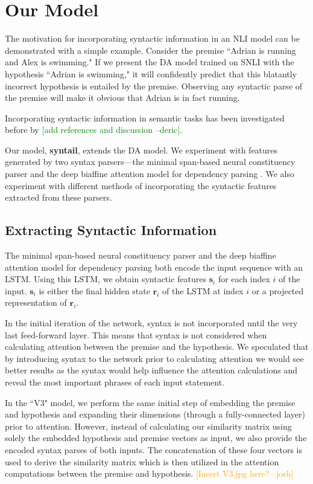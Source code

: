 \documentclass[11pt,a4paper]{article}
\newcommand{\dpcomment}[1]{\textcolor{green}{[#1 --deric]}}
\newcommand{\jbcomment}[1]{\textcolor{orange}{[#1 --josh]}}
\begin{document}
\section{Our Model}

The motivation for incorporating syntactic information in an NLI model
can be demonstrated with a simple example. Consider the premise ``Adrian is running
and Alex is swimming." If we present the DA model trained on SNLI with the
hypothesis ``Adrian is swimming," it will confidently predict that this
blatantly incorrect hypothesis is entailed by the premise. Observing
any syntactic parse of
the premise will make it obvious that Adrian is in fact running.

Incorporating syntactic information in semantic tasks has been investigated
before by \dpcomment{add references and discussion}.

Our model, \textbf{syntail}, extends the DA model.
We experiment with features generated by two syntax parsers---the
minimal span-based neural constituency parser \citep{Stern2017-co} and
the deep biaffine attention model for dependency parsing \citep{Dozat2016-gs}. We also experiment
with different methods of incorporating the syntactic features extracted
from these parsers.

\subsection{Extracting Syntactic Information}

The minimal span-based neural constituency parser and the deep biaffine attention
model for dependency parsing both encode the input sequence with an LSTM. Using
this LSTM, we obtain
syntactic features $\bm{s}_i$ for each index $i$ of the input. $\bm{s}_i$ is either
the final hidden state $\bm{r}_i$ of the LSTM at index $i$ or a projected
representation of $\bm{r}_i$.

In the initial 
iteration of the network, syntax is not incorporated until the very last feed-forward 
layer. This means that syntax is not considered when calculating attention between 
the premise and the hypothesis. We speculated that by introducing syntax to the 
network prior to calculating attention we would see better results as the syntax 
would help influence the attention calculations and reveal the most important phrases 
of each input statement.

In the ``V3" model, we perform the same initial step of embedding the premise and 
hypothesis and expanding their dimensions (through a fully-connected layer) prior to 
attention. However, instead of calculating our similarity matrix using solely the 
embedded hypothesis and premise vectors as input, we also provide the encoded syntax 
parses of both inputs. The concatenation of these four vectors is used to derive the 
similarity matrix which is then utilized in the attention computations between the 
premise and hypothesis. \jbcomment{Insert V3.jpg here?}
\end{document}
